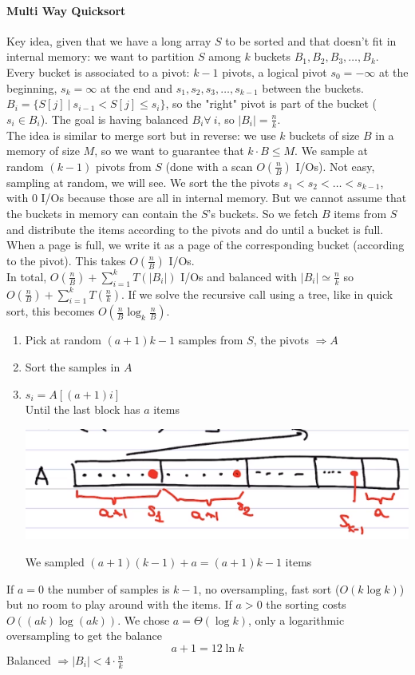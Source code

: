\documentclass[10pt]{report}
\begin{document}
\paragraph{Multi Way Quicksort} Key idea, given that we have a long array $S$ to be sorted and that doesn't fit in internal memory: we want to partition $S$ among $k$ buckets $B_1,B_2,B_3,\ldots,B_k$. Every bucket is associated to a pivot: $k-1$ pivots, a logical pivot $s_0 = -\infty$ at the beginning, $s_k = \infty$ at the end and $s_1,s_2,s_3,\ldots,s_{k-1}$ between the buckets.\\
$B_i=\{S[j]\:|\: s_{i-1} < S[j] \leq s_i\}$, so the "right" pivot is part of the bucket ($s_i \in B_i$). The goal is having balanced $B_i \forall\:i$, so $|B_i| = \frac{n}{k}$.\\
The idea is similar to merge sort but in reverse: we use $k$ buckets of size $B$ in a memory of size $M$, so we want to guarantee that $k\cdot B \leq M$. We sample at random $(k-1)$ pivots from $S$ (done with a scan $O(\frac{n}{B})$ I/Os). Not easy, sampling at random, we will see. We sort the the pivots $s_1 < s_2 < \ldots < s_{k-1}$, with 0 I/Os because those are all in internal memory. But we cannot assume that the buckets in memory can contain the $S$'s buckets. So we fetch $B$ items from $S$ and distribute the items according to the pivots and do until a bucket is full. When a page is full, we write it as a page of the corresponding bucket (according to the pivot). This takes $O(\frac{n}{B})$ I/Os.\\
In total, $O(\frac{n}{B}) + \sum_{i=1}^k T(|B_i|)$ I/Os and balanced with $|B_i| \simeq \frac{n}{k}$ so $O(\frac{n}{B}) + \sum_{i=1}^k T(\frac{n}{k})$. If we solve the recursive call using a tree, like in quick sort, this becomes $O(\frac{n}{B}\log_k \frac{n}{B})$.
\begin{enumerate}
	\item Pick at random $(a + 1)k - 1$ samples from $S$, the pivots $\Rightarrow A$
	\item Sort the samples in $A$
	\item $s_i = A[(a+1)i]$\\
	Until the last block has $a$ items
	\begin{center}
		\includegraphics[scale=0.5]{3.png}
	\end{center}
	We sampled $(a+1)(k-1) + a = (a+1)k -1$ items
\end{enumerate}
If $a = 0$ the number of samples is $k-1$, no oversampling, fast sort ($O(k\log k)$) but no room to play around with the items. If $a > 0$ the sorting costs $O((ak)\log (ak))$. We chose $a = \Theta(\log k)$, only a logarithmic oversampling to get the balance $$a + 1 = 12\ln k$$ Balanced $\Rightarrow |B_i| < 4\cdot\frac{n}{k}$
\end{document}
